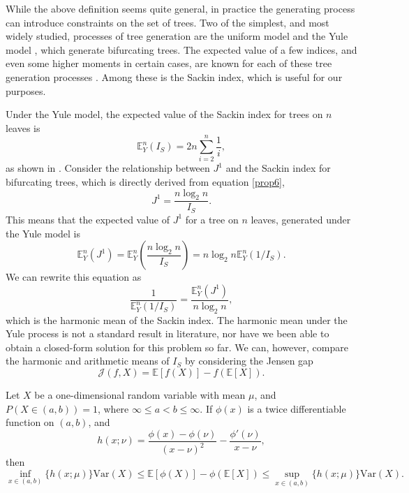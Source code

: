 While the above definition seems quite general, in practice the generating process can introduce constraints on the set of trees. Two of the simplest, and most widely studied, processes of tree generation are the uniform model \cite{rosen_vicariant_1978} and the Yule model \cite{yule_iimathematical_1925}, which generate bifurcating trees. The expected value of a few indices, and even some higher moments in certain cases, are known for each of these tree generation processes \cite{mir_new_2013, m_coronado_sackins_2020, goh_two_2022}. Among these is the Sackin index, which is useful for our purposes. \par
Under the Yule model, the expected value of the Sackin index for trees on $n$ leaves is
\begin{equation}
    \mathbb{E}_Y^n(I_S) = 2n\sum_{i=2}^n \frac{1}{i},
\end{equation}
as shown in \cite{kirkpatrick_searching_1993}. Consider the relationship between $J^1$ and the Sackin index for bifurcating trees, which is directly derived from equation \eqref{prop6},
\begin{equation}\label{J1ISrel}
    J^1 = \frac{n\log_2 n}{I_S}.
\end{equation}
This means that the expected value of $J^1$ for a tree on $n$ leaves, generated under the Yule model is
\begin{equation*}
    \mathbb{E}_Y^n(J^1) = \mathbb{E}_Y^n(\frac{n\log_2 n}{I_S}) = n\log_2 n \mathbb{E}_Y^n(1/I_S).
\end{equation*}
We can rewrite this equation as
\begin{equation}
    \frac{1}{\mathbb{E}_Y^n(1/I_S)} = \frac{\mathbb{E}_Y^n(J^1)}{n\log_2n},
\end{equation}
which is the harmonic mean of the Sackin index. The harmonic mean under the Yule process is not a standard result in literature, nor have we been able to obtain a closed-form solution for this problem so far. We can, however, compare the harmonic and arithmetic means of $I_S$ by considering the Jensen gap
\begin{equation}\label{JensenGap}
    \mathcal{J}(f, X) = \mathbb{E}[f(X)] - f(\mathbb{E}[X]).
\end{equation}

\begin{theorem}\label{jensen_thm}
    Let $X$ be a one-dimensional random variable with mean $\mu$, and $P(X\in(a,b))=1$, where $\infty\leq a<b\leq \infty$. If $\phi(x)$ is a twice differentiable function on $(a,b)$, and
    \begin{equation*}
        h(x;\nu) = \frac{\phi(x)-\phi(\nu)}{(x-\nu)^2} - \frac{\phi'(\nu)}{x-\nu},
    \end{equation*}
    then
    \begin{equation}
        \inf_{x\in(a,b)}\{h(x;\mu)\}\mathrm{Var}(X) \leq \mathbb{E}[\phi(X)] - \phi(\mathbb{E}[X]) \leq \sup_{x\in(a,b)}\{ h(x;\mu) \}\mathrm{Var}(X).
    \end{equation}
\end{theorem}

